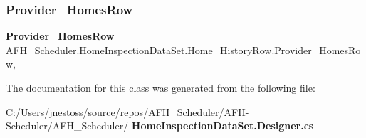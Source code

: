 \subsubsection{Provider\_HomesRow}
{\footnotesize\ttfamily \textbf{ Provider\+\_\+\+Homes\+Row} A\+F\+H\+\_\+\+Scheduler.\+Home\+Inspection\+Data\+Set.\+Home\+\_\+\+History\+Row.\+Provider\+\_\+\+Homes\+Row\hspace{0.3cm}{\ttfamily [get]}, {\ttfamily [set]}}



The documentation for this class was generated from the following file\+:\begin{DoxyCompactItemize}
\item 
C\+:/\+Users/jnestoss/source/repos/\+A\+F\+H\+\_\+\+Scheduler/\+A\+F\+H-\/\+Scheduler/\+A\+F\+H\+\_\+\+Scheduler/\textbf{ Home\+Inspection\+Data\+Set.\+Designer.\+cs}\end{DoxyCompactItemize}

